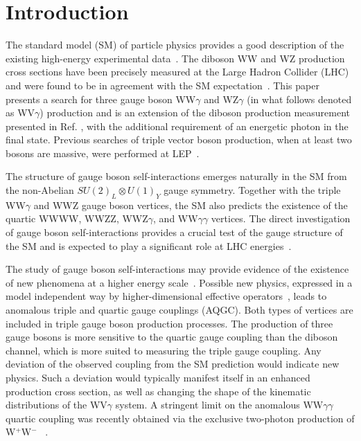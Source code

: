 \clearpage{}
\section{Introduction}
\label{sec:intro}

The standard model (SM) of particle physics provides a good description of the existing 
high-energy experimental data~\cite{Beringer:1900zz}. The diboson WW and WZ production cross sections have been
precisely measured at the Large Hadron Collider (LHC) and were found to be in agreement
with the SM expectation~\cite{CMSdiboson,Chatrchyan:2012bd,Chatrchyan:2013yaa,ATLAS:2012mec,Aad:2012twa}. This paper presents a 
search for three gauge boson WW$\gamma$ and WZ$\gamma$ (in what follows denoted as WV$\gamma$) production and is an extension of the 
diboson production measurement presented in Ref. \cite{Chatrchyan:2012bd}, with the additional requirement of an energetic photon 
in the final state. Previous searches of triple vector boson production, when at
least two bosons are massive, were performed at LEP~\cite{wwaLEP:1999,Achard:2001eg,Abdallah:2003xn,Heister:2004yd,Schael:2013ita}.

The structure of gauge boson self-interactions emerges
naturally in the SM from the non-Abelian $SU(2)_{L} \otimes U(1)_{Y}$ gauge
symmetry. Together with the triple WW$\gamma$ and
WWZ gauge boson vertices, the SM also predicts the existence of the quartic
WWWW, WWZZ, WWZ$\gamma$, and WW$\gamma\gamma$ vertices.  The direct
investigation of gauge boson self-interactions provides a crucial test
of the gauge structure of the SM and is expected to play a significant 
role at LHC energies~\cite{Belyaev:1998ih}.  

The study of gauge boson self-interactions may provide evidence of the
existence of new phenomena at a higher energy
scale~\cite{aihara1996,Du:2012vh,Fichet:2013ola,Giudice:2007fh}.
Possible new physics, expressed in a model independent
way by higher-dimensional effective operators~\cite{500GeVNLC,
Belanger:1999, Bosonic:2004PRD, Eboli:2006wa,Yang:2012vv,Ye:2013psa}, leads to anomalous
triple and quartic gauge couplings (AQGC). Both types of vertices are
included in triple gauge boson production processes. The production of three gauge bosons is more sensitive to the quartic 
gauge coupling than the diboson channel, which is more suited to measuring the triple gauge coupling. 
Any deviation of the observed coupling from the SM prediction would indicate new physics.
Such a deviation would typically manifest itself in an enhanced production cross section, as well as
changing the shape of the kinematic distributions of the  WV$\gamma$ system.
A stringent limit on the anomalous WW$\gamma\gamma$ quartic coupling was recently obtained
via the exclusive two-photon production of W$^+$W$^-$ ~\cite{Chatrchyan:2013foa}.

